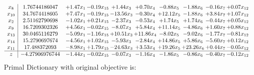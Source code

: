 \documentclass[9pt]{article}
\begin{document}
\[\begin{array}{c| c c@{\hskip 2pt} c@{\hskip 2pt} c@{\hskip 2pt} c@{\hskip 2pt} c@{\hskip 2pt} c@{\hskip 2pt} c@{\hskip 2pt} c@{\hskip 2pt} }
 x_{8}   &  1.76744186047 & +  1.47 x_{1} & -0.19 x_{15} & +  1.44 x_{3} & +  0.70 x_{4} & -0.88 x_{5} & -1.88 x_{6} & -0.16 x_{7} & +  0.07 x_{12}\\
 x_{10}   &  34.7674418605 & +  7.47 x_{1} & -0.19 x_{15} & -13.56 x_{3} & -0.30 x_{4} & + 12.12 x_{5} & -1.88 x_{6} & +  3.84 x_{7} & +  1.07 x_{12}\\
 x_{2}   &  2.51162790698 & -1.02 x_{1} & +  0.21 x_{15} & -2.37 x_{3} & -0.53 x_{4} & +  1.74 x_{5} & +  1.74 x_{6} & -0.44 x_{7} & +  0.05 x_{12}\\
 x_{9}   &  16.7209302326 & +  4.56 x_{1} & -0.02 x_{15} & -8.07 x_{3} & +  5.84 x_{4} & + 11.14 x_{5} & -4.86 x_{6} & +  1.60 x_{7} & +  0.88 x_{12}\\
 x_{13}   &  30.0465116279 & -5.09 x_{1} & -1.16 x_{15} & + 10.51 x_{3} & + 11.86 x_{4} & -8.02 x_{5} & -9.02 x_{6} & -1.77 x_{7} & -0.81 x_{12}\\
 x_{14}   &  15.2790697674 & -4.56 x_{1} & +  1.02 x_{15} & -5.93 x_{3} & -2.84 x_{4} & + 14.86 x_{5} & +  5.86 x_{6} & -5.60 x_{7} & +  0.12 x_{12}\\
 x_{11}   &  17.488372093 & -8.98 x_{1} & +  1.79 x_{15} & -24.63 x_{3} & +  3.53 x_{4} & + 19.26 x_{5} & + 23.26 x_{6} & +  0.44 x_{7} & -0.05 x_{12}\\
\hline
z    &  -4.27906976744 & -1.44 x_{1} & -0.02 x_{15} & -0.07 x_{3} & -1.16 x_{4} & -1.86 x_{5} & -0.86 x_{6} & -0.40 x_{7} & -0.12 x_{12}\\
\end{array}\]
Primal Dictionary with original objective is:
\end{document}
